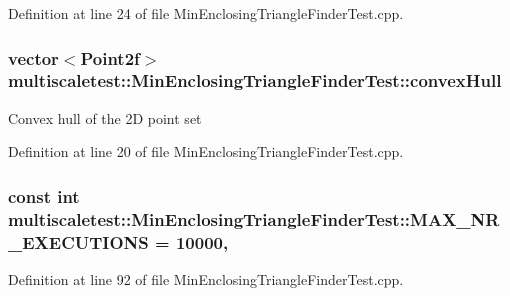 Definition at line 24 of file Min\-Enclosing\-Triangle\-Finder\-Test.\-cpp.

\hypertarget{classmultiscaletest_1_1MinEnclosingTriangleFinderTest_a309e2484e202fab797520fc15517d95d}{
\subsubsection[{convex\-Hull}]{\setlength{\rightskip}{0pt plus 5cm}vector$<$Point2f$>$ multiscaletest\-::\-Min\-Enclosing\-Triangle\-Finder\-Test\-::convex\-Hull\hspace{0.3cm}{\ttfamily [protected]}}}\label{classmultiscaletest_1_1MinEnclosingTriangleFinderTest_a309e2484e202fab797520fc15517d95d}
Convex hull of the 2\-D point set 

Definition at line 20 of file Min\-Enclosing\-Triangle\-Finder\-Test.\-cpp.

\hypertarget{classmultiscaletest_1_1MinEnclosingTriangleFinderTest_a061721ac8458f238f964b3f63088df8a}{
\subsubsection[{M\-A\-X\-\_\-\-N\-R\-\_\-\-E\-X\-E\-C\-U\-T\-I\-O\-N\-S}]{\setlength{\rightskip}{0pt plus 5cm}const int multiscaletest\-::\-Min\-Enclosing\-Triangle\-Finder\-Test\-::\-M\-A\-X\-\_\-\-N\-R\-\_\-\-E\-X\-E\-C\-U\-T\-I\-O\-N\-S = 10000\hspace{0.3cm}{\ttfamily [static]}, {\ttfamily [private]}}}\label{classmultiscaletest_1_1MinEnclosingTriangleFinderTest_a061721ac8458f238f964b3f63088df8a}


Definition at line 92 of file Min\-Enclosing\-Triangle\-Finder\-Test.\-cpp.

